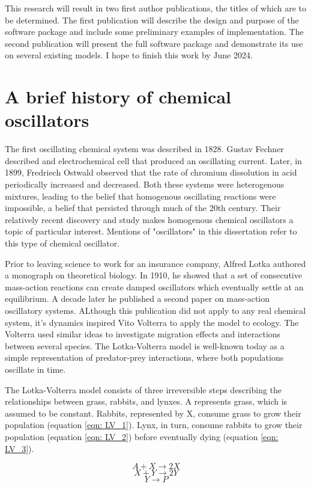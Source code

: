 \documentclass[12pt]{report}
\begin{document}
This research will result in two first author publications, the titles of which are to be determined. The first publication will describe the design and purpose of the software package and include some preliminary examples of implementation. The second publication will present the full software package and demonstrate its use on several existing models. I hope to finish this work by June 2024.

\section{A brief history of chemical oscillators}
The first oscillating chemical system was described in 1828. Gustav Fechner described and electrochemical cell that produced an oscillating current. Later, in 1899, Fredriech Ostwald observed that the rate of chromium dissolution in acid periodically increased and decreased. Both these systems were heterogenous mixtures, leading to the belief that homogenous oscillating reactions were impossible, a belief that persisted through much of the 20th century. Their relatively recent discovery and study makes homogenous chemical oscillators a topic of particular interest. Mentions of "oscillators" in this dissertation refer to this type of chemical oscillator.

Prior to leaving science to work for an insurance company, Alfred Lotka authored a monograph on theoretical biology. In 1910, he showed that a set of consecutive mass-action reactions can create damped oscillators which eventually settle at an equilibrium. A decade later he published a second paper on mass-action oscillatory systems. ALthough this publication did not apply to any real chemical system, it's dynamics inspired Vito Volterra to apply the model to ecology. The Volterra used similar ideas to investigate migration effects and interactions between several species. The Lotka-Volterra model is well-known today as a simple representation of predator-prey interactions, where both populations oscillate in time.

The Lotka-Volterra model consists of three irreversible steps describing the relationships between grass, rabbits, and lynxes. A represents grass, which is assumed to be constant. Rabbits, represented by X, consume grass to grow their population (equation \ref{eqn: LV_1}). Lynx, in turn, consume rabbits to grow their population (equation \ref{eqn: LV_2}) before eventually dying (equation \ref{eqn: LV_3}).

\begin{equation}
\label{eqn: LV_1}
A + X \to 2X
\end{equation}
\begin{equation}
\label{eqn: LV_2}
X + Y \to 2Y
\end{equation}
\begin{equation}
\label{eqn: LV_3}
Y \to P
\end{equation}
\end{document}
